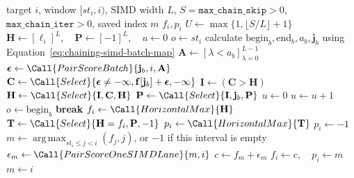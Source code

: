 \begin{algorithm}[H]
\caption{Bounded SIMD B1}
\label{alg:chaining-b5}
\small
\begin{algorithmic}[1]
  \Require target \(i\), window \([st_i,i)\), SIMD width \(L\),
           \(S=\texttt{max\_chain\_skip}>0\),
           \(\texttt{max\_chain\_iter}>0\), saved index \(m\)
  \Ensure \(f_i,p_i\)
  \State \(U\gets\max\{1,\lfloor S/L\rfloor+1\}\)
  \State \(\mathbf H\gets[\ell_i]^L,\quad
         \mathbf P\gets[-1]^L,\quad u\gets0\)
  \State \(o\gets st_i\)
        \Comment{no omitted interval yet: \([st_i,o)\) is empty}
    \State calculate \(\mathrm{begin}_b,\mathrm{end}_b,a_b,\mathbf j_b\) using
           Equation~\ref{eq:chaining-simd-batch-map}
    \State \(\mathbf A\gets[\lambda<a_b]_{\lambda=0}^{L-1}\)
    \State \(\boldsymbol\epsilon\gets
           \Call{PairScoreBatch}{\mathbf j_b,i,\mathbf A}\)
    \State \(\mathbf C\gets
           \Call{Select}{\boldsymbol\epsilon\neq-\infty,
             \mathbf f[\mathbf j_b]+\boldsymbol\epsilon,-\infty}\)
    \State \(\mathbf I\gets(\mathbf C>\mathbf H)\)
    \State \(\mathbf H\gets\Call{Select}{\mathbf I,\mathbf C,\mathbf H}\)
    \State \(\mathbf P\gets\Call{Select}{\mathbf I,\mathbf j_b,\mathbf P}\)
      \State \(u\gets0\)
    \Else
      \State \(u\gets u+1\)
    \EndIf
      \State \(o\gets \mathrm{begin}_b\)
            \Comment{batch loop omits \([st_i,o)\)}
      \State \textbf{break}
    \EndIf
  \EndFor
  \State \(f_i\gets\Call{HorizontalMax}{\mathbf H}\)
  \State \(\mathbf T\gets\Call{Select}{\mathbf H=f_i,\mathbf P,-1}\)
  \State \(p_i\gets\Call{HorizontalMax}{\mathbf T}\)
    \State \(p_i\gets-1\)
  \EndIf
    \State \(m\gets\operatorname*{arg\,max}_{st_i\leq j<i}(f_j,j)\),
           or \(-1\) if this interval is empty
  \EndIf
    \State \(\epsilon_m\gets\Call{PairScoreOneSIMDLane}{m,i}\)
      \State \(c\gets f_m+\epsilon_m\)
        \State \(f_i\gets c,\quad p_i\gets m\)
      \EndIf
    \EndIf
  \EndIf
    \State \(m\gets i\)
  \EndIf
\end{algorithmic}
\end{algorithm}

